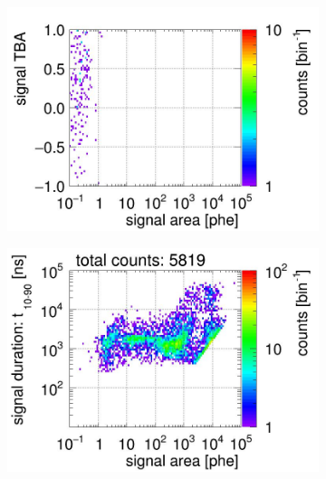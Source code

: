 \begin{landscape}
\begin{figure}[!p]
\begin{subfigure}[t]{0.32\textwidth}
		\includegraphics[width=\figurewidth,clip,trim={0 8 0 40}]{Figures/GasTest/CutsValid/res64767/tbapaX04Vecfig64767.jpg}
		\caption{}
		\label{fig:signal selection 04}
	\end{subfigure}
	\begin{subfigure}[t]{0.32\textwidth}
	\centering
		\includegraphics[width=\figurewidth,clip,trim={0 98 0 15}]{Figures/GasTest/CutsValid/res64767/pdpa05Vecfig64767.jpg}

\end{subfigure}
\end{figure}
\end{landscape}
